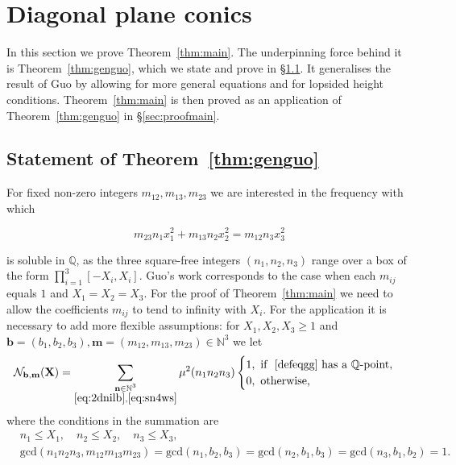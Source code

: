 \documentclass[a4paper,12pt,reqno]{amsart}
\numberwithin{equation}{section} \numberwithin{figure}{section}
\newcommand\N{\mathbb{N}}
\newcommand\Q{\mathbb{Q}}
\newcommand\QQ{\mathbb{Q}}
\renewcommand{\b}{\mathbf}
\renewcommand{\c}{\mathcal}
\renewcommand{\gcd}{\textrm{gcd}}
\renewcommand{\leq}{\leqslant}
\renewcommand{\geq}{\geqslant}
\renewcommand{\#}{\sharp}
\theoremstyle{definition}
\newcommand{\dan}[1]{{\color{blue} \sf $\clubsuit\clubsuit\clubsuit$ Dan: [#1]}}
\numberwithin{lemma}{section}
\newcommand{\beq}[2]
{
\begin{equation}
\label{#1}
{#2}
\end{equation}
}
\begin{document}
 
  
\section{Diagonal plane conics}
\label{sgenguoresthrme9} 
In this section we prove  Theorem~\ref{thm:main}.
The underpinning force behind it is 
Theorem~\ref{thm:genguo}, which  we state and 
prove 
in \S\ref{ss:underspin}.  It generalises   the result of Guo \cite{Guo95} by allowing for  more general equations and   for lopsided height conditions. 
Theorem~\ref{thm:main} is then proved as an application of  Theorem~\ref{thm:genguo} in \S\ref{sec:proofmain}.


\subsection{Statement of Theorem~\ref{thm:genguo}}
\label{ss:underspin}
For   fixed 
 non-zero
 integers  $m_{12},m_{13},m_{23}$  we are interested in      the frequency with which     
 \beq{defeqgg}{
m_{23} n_1 x_1^2+  m_{13} n_2 x_2^2  = m_{12} n_3 x_3^2  }
is soluble in $\Q$, as the  three   square-free integers $(n_1,n_2,n_3)$ range over  
  a box of the form $\prod_{i=1}^3 [-X_i,X_i]$.
Guo's work corresponds to the   case when each $m_{ij}$ equals $1$
and $X_1=X_2=X_3$. 
For the proof of Theorem~\ref{thm:main} we need to allow   
the coefficients $m_{ij}$ to tend to infinity with $X_i$.
For the application it is necessary  to add more flexible assumptions:
for  $X_1,X_2,X_3\geq 1 $  and $\b b =( b_1,b_2,b_3),  \b m=(m_{12},m_{13}, m_{23}) \in \N^3$  we  
let    \beq{def:nbmx}{ \c N_{\b b , \b m }(\b X) =  \sum_{\substack{\b n \in \N^3 \\ \eqref{eq:2dnilb}, \eqref{eq:sn4ws} }}
\mu^2(n_1n_2n_3) 
\begin{cases} 1, \text{ if } ~\eqref{defeqgg}  \text{ has a }\QQ\text{-point},\\ 0, \text{ otherwise,} \end{cases}
}where  the conditions in the summation are
\begin{align}
 & n_1    \leq    X_1,  \quad    n_2   \leq    X_2,  \quad
n_3   \leq   X_3, \label{eq:2dnilb} \\
& \gcd(    n_1 n_2 n_3, m_{12} m_{13} 
m_{23}    ) =  \gcd( n_1 ,   b_2,b_3)  = \gcd( n_2 ,   b_1,b_3)  = \gcd( n_3 ,   b_1,b_2)  =1.\label{eq:sn4ws} 
\end{align}
\end{document}
